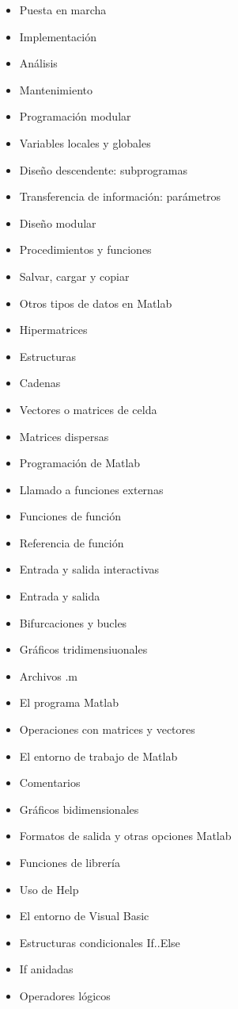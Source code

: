 \begin{itemize}
\item Puesta en marcha
\item Implementación
\item Análisis
\item Mantenimiento
\item Programación modular
\item Variables locales y globales
\item Diseño descendente: subprogramas
\item Transferencia de información: parámetros
\item Diseño modular
\item Procedimientos y funciones
\item Salvar, cargar y copiar
\item Otros tipos de datos en Matlab
\item Hipermatrices
\item Estructuras
\item Cadenas
\item Vectores o matrices de celda
\item Matrices dispersas
\item Programación de Matlab
\item Llamado a funciones externas
\item Funciones de función
\item Referencia de función
\item Entrada y salida interactivas
\item Entrada y salida
\item Bifurcaciones y bucles
\item Gráficos tridimensiuonales
\item Archivos .m
\item El programa Matlab
\item Operaciones con matrices y vectores
\item El entorno de trabajo de Matlab
\item Comentarios
\item Gráficos bidimensionales
\item Formatos de salida y otras opciones Matlab
\item Funciones de librería
\item Uso de Help
\item El entorno de Visual Basic
\item Estructuras condicionales If..Else
\item If anidadas
\item Operadores lógicos

\end{itemize}
